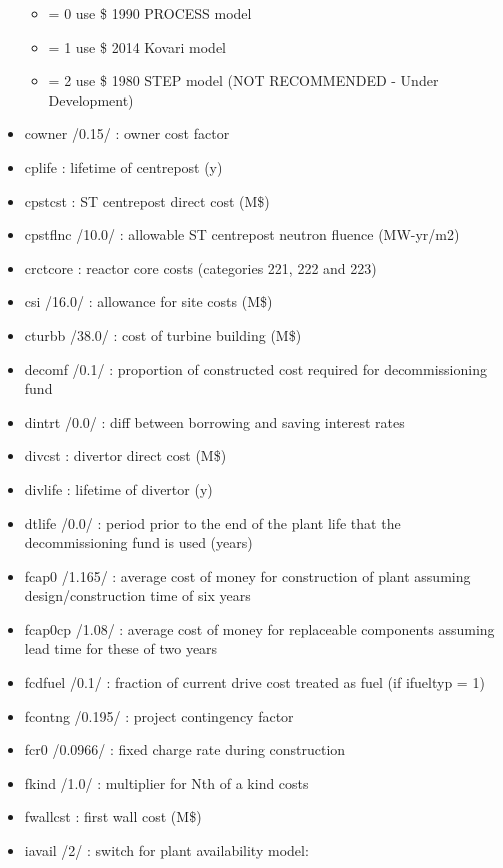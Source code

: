 \documentclass[]{article}
\providecommand{\tightlist}{%
  \setlength{\itemsep}{0pt}\setlength{\parskip}{0pt}}
\begin{document}
\begin{itemize}
  \begin{itemize}
  \tightlist
  \item
    = 0 use \$ 1990 PROCESS model
  \item
    = 1 use \$ 2014 Kovari model
  \item
    = 2 use \$ 1980 STEP model (NOT RECOMMENDED - Under Development)
  \end{itemize}
\item
  cowner /0.15/ : owner cost factor
\item
  cplife : lifetime of centrepost (y)
\item
  cpstcst : ST centrepost direct cost (M\$)
\item
  cpstflnc /10.0/ : allowable ST centrepost neutron fluence (MW-yr/m2)
\item
  crctcore : reactor core costs (categories 221, 222 and 223)
\item
  csi /16.0/ : allowance for site costs (M\$)
\item
  cturbb /38.0/ : cost of turbine building (M\$)
\item
  decomf /0.1/ : proportion of constructed cost required for
  decommissioning fund
\item
  dintrt /0.0/ : diff between borrowing and saving interest rates
\item
  divcst : divertor direct cost (M\$)
\item
  divlife : lifetime of divertor (y)
\item
  dtlife /0.0/ : period prior to the end of the plant life that the
  decommissioning fund is used (years)
\item
  fcap0 /1.165/ : average cost of money for construction of plant
  assuming design/construction time of six years
\item
  fcap0cp /1.08/ : average cost of money for replaceable components
  assuming lead time for these of two years
\item
  fcdfuel /0.1/ : fraction of current drive cost treated as fuel (if
  ifueltyp = 1)
\item
  fcontng /0.195/ : project contingency factor
\item
  fcr0 /0.0966/ : fixed charge rate during construction
\item
  fkind /1.0/ : multiplier for Nth of a kind costs
\item
  fwallcst : first wall cost (M\$)
\item
  iavail /2/ : switch for plant availability model:


\end{itemize}
\end{document}
